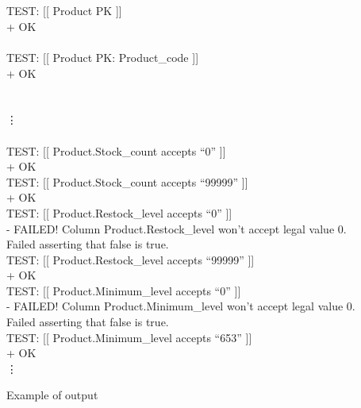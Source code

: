 \documentclass[sigconf, authordraft]{acmart}
\begin{document}
\begin{table}
\begin{tabbing}
         \\[\codeskip]
         \\[\codeskip]
        TEST: [[ Product PK ]]  \\
        \>  \textcolor{test green}{+ OK} \\
         \\[\codeskip]
        TEST: [[ Product PK: Product\_code ]]  \\
        \>  \textcolor{test green}{+ OK} \\
         \\[\codeskip]
         \\[\dotvskip]
        \hspace*{\dothskip}\vdots \\
         \\[\codeskip]
        TEST: [[ Product.Stock\_count accepts ``0'' ]]  \\
        \>  \textcolor{test green}{+ OK} \\
        TEST: [[ Product.Stock\_count accepts ``99999'' ]]  \\
        \>  \textcolor{test green}{+ OK} \\
        TEST: [[ Product.Restock\_level accepts ``0'' ]]  \\
        \>  \textcolor{test red}{- FAILED! Column Product.Restock\_level won't accept legal value 0.} \\
        \textcolor{test red}{Failed asserting that false is true.} \\
        TEST: [[ Product.Restock\_level accepts ``99999'' ]]  \\
        \>  \textcolor{test green}{+ OK} \\
        TEST: [[ Product.Minimum\_level accepts ``0'' ]]  \\
        \>  \textcolor{test red}{- FAILED! Column Product.Minimum\_level won't accept legal value 0.} \\
        \textcolor{test red}{Failed asserting that false is true.} \\
        TEST: [[ Product.Minimum\_level accepts ``653'' ]]  \\
        \>  \textcolor{test green}{+ OK} \\[\dotvskip]
        \hspace*{\dothskip}\vdots \\
    \end{tabbing}
    \caption{Example of output}
\end{table}
\end{document}

